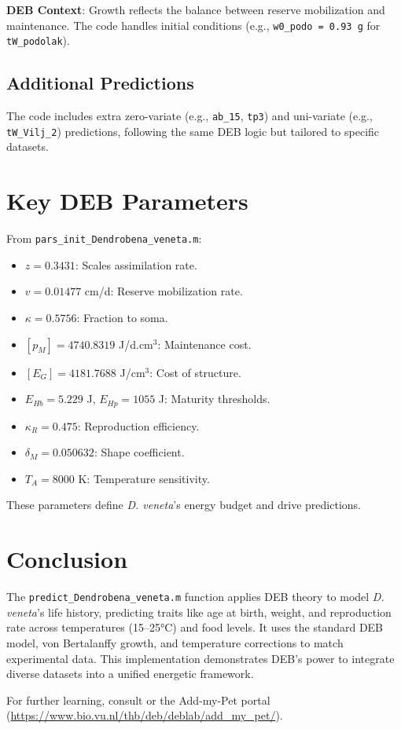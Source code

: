 \documentclass[11pt]{article}
\begin{document}
\textbf{DEB Context}: Growth reflects the balance between reserve mobilization and maintenance. The code handles initial conditions (e.g., \texttt{w0\_podo = 0.93 g} for \texttt{tW\_podolak}).

\subsection{Additional Predictions}
The code includes extra zero-variate (e.g., \texttt{ab\_15}, \texttt{tp3}) and uni-variate (e.g., \texttt{tW\_Vilj\_2}) predictions, following the same DEB logic but tailored to specific datasets.

\section{Key DEB Parameters}
From \texttt{pars\_init\_Dendrobena\_veneta.m}:
\begin{itemize}
    \item $z = 0.3431$: Scales assimilation rate.
    \item $v = 0.01477$ cm/d: Reserve mobilization rate.
    \item $\kappa = 0.5756$: Fraction to soma.
    \item $[p_M] = 4740.8319$ J/d.cm$^3$: Maintenance cost.
    \item $[E_G] = 4181.7688$ J/cm$^3$: Cost of structure.
    \item $E_{Hb} = 5.229$ J, $E_{Hp} = 1055$ J: Maturity thresholds.
    \item $\kappa_R = 0.475$: Reproduction efficiency.
    \item $\delta_M = 0.050632$: Shape coefficient.
    \item $T_A = 8000$ K: Temperature sensitivity.
\end{itemize}
These parameters define \textit{D. veneta}’s energy budget and drive predictions.

\section{Conclusion}
The \texttt{predict\_Dendrobena\_veneta.m} function applies DEB theory to model \textit{D. veneta}’s life history, predicting traits like age at birth, weight, and reproduction rate across temperatures (15–25°C) and food levels. It uses the standard DEB model, von Bertalanffy growth, and temperature corrections to match experimental data. This implementation demonstrates DEB’s power to integrate diverse datasets into a unified energetic framework.

For further learning, consult \citet{Kooijman2010} or the Add-my-Pet portal (\url{https://www.bio.vu.nl/thb/deb/deblab/add_my_pet/}).



\end{document}

